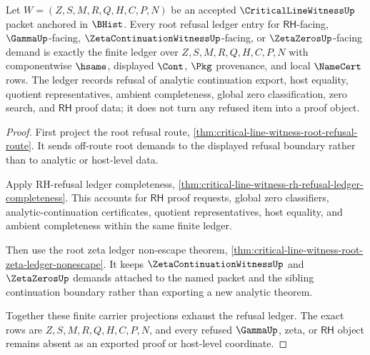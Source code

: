 \begin{theorem}
\label{thm:criticalline-witness-root-refusal-ledger-exactness}
Let $W=(Z,S,M,R,Q,H,C,P,N)$ be an accepted $\CriticalLineWitnessUp$ packet anchored in $\BHist$. Every root refusal ledger entry for $\mathsf{RH}$-facing, $\GammaUp$-facing, $\ZetaContinuationWitnessUp$-facing, or $\ZetaZerosUp$-facing demand is exactly the finite ledger over $Z,S,M,R,Q,H,C,P,N$ with componentwise $\hsame$, displayed $\Cont$, $\Pkg$ provenance, and local $\NameCert$ rows. The ledger records refusal of analytic continuation export, host equality, quotient representatives, ambient completeness, global zero classification, zero search, and $\mathsf{RH}$ proof data; it does not turn any refused item into a proof object.
\end{theorem}
\begin{proof}
First project the root refusal route, \autoref{thm:critical-line-witness-root-refusal-route}. It sends off-route root demands to the displayed refusal boundary rather than to analytic or host-level data.

Apply RH-refusal ledger completeness, \autoref{thm:critical-line-witness-rh-refusal-ledger-completeness}. This accounts for $\mathsf{RH}$ proof requests, global zero classifiers, analytic-continuation certificates, quotient representatives, host equality, and ambient completeness within the same finite ledger.

Then use the root zeta ledger non-escape theorem, \autoref{thm:critical-line-witness-root-zeta-ledger-nonescape}. It keeps $\ZetaContinuationWitnessUp$ and $\ZetaZerosUp$ demands attached to the named packet and the sibling continuation boundary rather than exporting a new analytic theorem.

Together these finite carrier projections exhaust the refusal ledger. The exact rows are $Z,S,M,R,Q,H,C,P,N$, and every refused $\GammaUp$, zeta, or $\mathsf{RH}$ object remains absent as an exported proof or host-level coordinate.
\end{proof}

